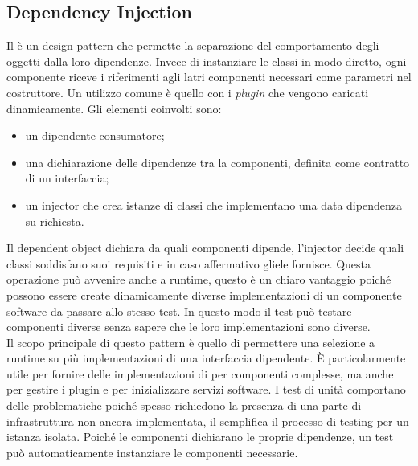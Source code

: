  	
	
	
	\subsection{Dependency Injection} %
	Il  è un design pattern che permette la separazione del comportamento degli oggetti dalla loro dipendenze. Invece di instanziare le classi in modo diretto, ogni componente riceve i riferimenti agli latri componenti necessari come parametri nel costruttore. Un utilizzo comune è quello con i 	\emph{plugin} che vengono caricati dinamicamente. Gli elementi coinvolti sono:
	\begin{itemize}
		\item un dipendente consumatore;
		\item una dichiarazione delle dipendenze tra la componenti, definita come contratto di un interfaccia;
		\item un injector che crea istanze di classi che implementano una data dipendenza su richiesta.
	\end{itemize}
	Il dependent object dichiara da quali componenti dipende, l'injector decide quali classi soddisfano suoi requisiti e in caso affermativo gliele fornisce. Questa operazione può avvenire anche a runtime, questo è un chiaro vantaggio poiché possono essere create dinamicamente diverse implementazioni di un componente software da passare allo stesso test. In questo modo il test può testare componenti diverse senza sapere che le loro implementazioni sono diverse. \\
	Il scopo principale di questo pattern è quello di permettere una selezione a runtime su più implementazioni di una interfaccia dipendente. \`E particolarmente utile per fornire delle implementazioni di  per componenti complesse, ma anche per gestire i plugin e per inizializzare servizi software. I test di unità comportano delle problematiche poiché spesso richiedono la presenza di una parte di infrastruttura non ancora implementata, il  semplifica il processo di testing per un istanza isolata. Poiché le componenti dichiarano le proprie dipendenze, un test può automaticamente instanziare le componenti necessarie. \\
	 
